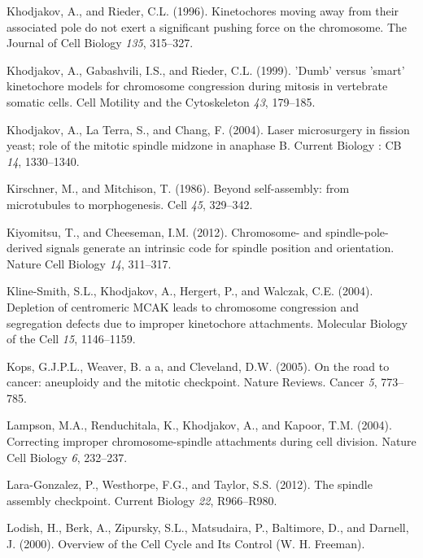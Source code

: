 \documentclass[12pt,a4paper,twoside,openright]{book}
\begin{document}
Khodjakov, A., and Rieder, C.L. (1996). Kinetochores moving away from
their associated pole do not exert a significant pushing force on the
chromosome. The Journal of Cell Biology \emph{135}, 315--327.

Khodjakov, A., Gabashvili, I.S., and Rieder, C.L. (1999). 'Dumb' versus
'smart' kinetochore models for chromosome congression during mitosis in
vertebrate somatic cells. Cell Motility and the Cytoskeleton \emph{43},
179--185.

Khodjakov, A., La Terra, S., and Chang, F. (2004). Laser microsurgery in
fission yeast; role of the mitotic spindle midzone in anaphase B.
Current Biology : CB \emph{14}, 1330--1340.

Kirschner, M., and Mitchison, T. (1986). Beyond self-assembly: from
microtubules to morphogenesis. Cell \emph{45}, 329--342.

Kiyomitsu, T., and Cheeseman, I.M. (2012). Chromosome- and
spindle-pole-derived signals generate an intrinsic code for spindle
position and orientation. Nature Cell Biology \emph{14}, 311--317.

Kline-Smith, S.L., Khodjakov, A., Hergert, P., and Walczak, C.E. (2004).
Depletion of centromeric MCAK leads to chromosome congression and
segregation defects due to improper kinetochore attachments. Molecular
Biology of the Cell \emph{15}, 1146--1159.

Kops, G.J.P.L., Weaver, B. a a, and Cleveland, D.W. (2005). On the road
to cancer: aneuploidy and the mitotic checkpoint. Nature Reviews. Cancer
\emph{5}, 773--785.

Lampson, M.A., Renduchitala, K., Khodjakov, A., and Kapoor, T.M. (2004).
Correcting improper chromosome-spindle attachments during cell division.
Nature Cell Biology \emph{6}, 232--237.

Lara-Gonzalez, P., Westhorpe, F.G., and Taylor, S.S. (2012). The spindle
assembly checkpoint. Current Biology \emph{22}, R966--R980.

Lodish, H., Berk, A., Zipursky, S.L., Matsudaira, P., Baltimore, D., and
Darnell, J. (2000). Overview of the Cell Cycle and Its Control (W. H.
Freeman).
\end{document}
